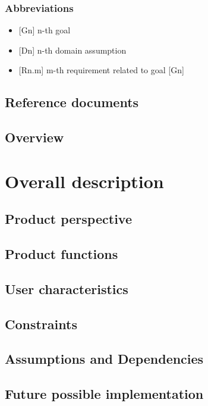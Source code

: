 \documentclass[12pt, a4paper]{article}
\begin{document}
			\subsubsection{Abbreviations}
					\begin{itemize}
						\item {[Gn]} n-th goal 
						\item {[Dn]} n-th domain assumption
						\item {[Rn.m]} m-th requirement related to goal [Gn]
					\end{itemize}
	
	\subsection{Reference documents}
	
	\subsection{Overview}


\newpage
\section{Overall description}
	\subsection{Product perspective}

	\subsection{Product functions}
		
	\subsection{User characteristics}

	\subsection{Constraints}
	
	\subsection{Assumptions and Dependencies}
	
	\subsection{Future possible implementation}
\end{document}
